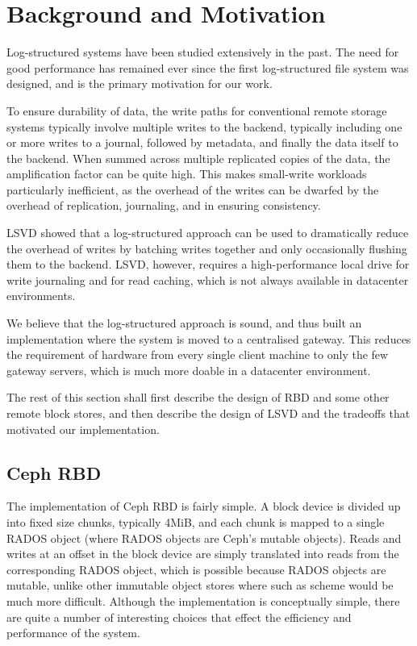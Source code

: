 \section{Background and Motivation}

Log-structured systems have been studied extensively in the past. The need for
good performance has remained ever since the first log-structured file system
was designed, and is the primary motivation for our work.

To ensure durability of data, the write paths for conventional remote storage
systems typically involve multiple writes to the backend, typically including
one or more writes to a journal, followed by metadata, and finally the data
itself to the backend. When summed across multiple replicated copies of the
data, the amplification factor can be quite high. This makes small-write
workloads particularly inefficient, as the overhead of the writes can be
dwarfed by the overhead of replication, journaling, and in ensuring consistency.

LSVD showed that a log-structured approach can be used to dramatically reduce
the overhead of writes by batching writes together and only occasionally
flushing them to the backend. LSVD, however, requires a high-performance local
drive for write journaling and for read caching, which is not always available
in datacenter environments.

We believe that the log-structured approach is sound, and thus built an
implementation where the system is moved to a centralised gateway. This reduces
the requirement of hardware from every single client machine to only the few
gateway servers, which is much more doable in a datacenter environment.

The rest of this section shall first describe the design of RBD and some other
remote block stores, and then describe the design of LSVD and the tradeoffs
that motivated our implementation.

\subsection{Ceph RBD}

The implementation of Ceph RBD is fairly simple. A block device is divided up
into fixed size chunks, typically 4MiB, and each chunk is mapped to a single
RADOS object (where RADOS objects are Ceph's mutable objects). Reads and writes
at an offset in the block device are simply translated into reads from the
corresponding RADOS object, which is possible because RADOS objects are mutable,
unlike other immutable object stores where such as scheme would be much more
difficult. Although the implementation is conceptually simple, there are quite a
number of interesting choices that effect the efficiency and performance of the
system.

